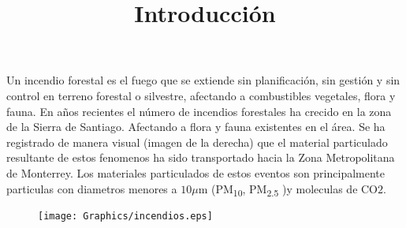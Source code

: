 \title{Introducción}

\begin{minipage}{0.65\linewidth}
  Un incendio forestal es el fuego que se extiende sin planificación, sin gestión y sin control en terreno forestal o silvestre, afectando a combustibles vegetales, flora y fauna. En años recientes el número de incendios forestales ha crecido en la zona de la Sierra de Santiago. Afectando a flora y fauna existentes en el área. Se ha registrado de manera visual (imagen de la derecha) que el material particulado resultante de estos fenomenos ha sido transportado hacia la Zona Metropolitana de Monterrey. Los materiales particulados de estos eventos son principalmente particulas con diametros menores a $10\mu$m (PM\textsubscript{10}, PM\textsubscript{2.5} )y moleculas de CO$2$.
\end{minipage}
\hspace*{0.2cm}
\begin{minipage}{0.23\linewidth}
  \begin{figure}[H]
    \centering
    \texttt{[image: Graphics/incendios.eps]}
    \caption*{}
  \end{figure}
\end{minipage}